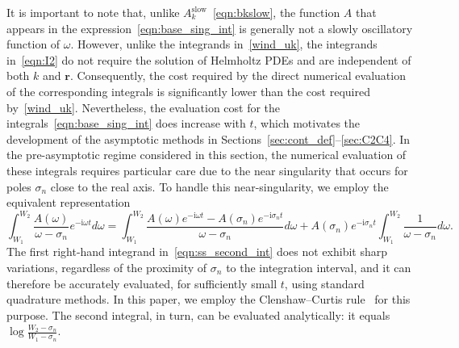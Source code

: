 \documentclass[11pt]{article}
\theoremstyle{plain}
\theoremstyle{remark}
\def \br{\mathbf{r}}
\begin{document}
It is important to note that, unlike
$A_k^{\mathrm{slow}}$~\eqref{eqn:bkslow}, the function $A$ that
appears in the expression~\eqref{eqn:base_sing_int} is generally not a
slowly oscillatory function of $\omega$. However, unlike the
integrands in~\eqref{wind_uk}, the integrands in~\eqref{eqn:I2} do not
require the solution of Helmholtz PDEs and are independent of both $k$
and $\br$. Consequently, the cost required by the direct numerical
evaluation of the corresponding integrals is significantly lower than
the cost required by~\eqref{wind_uk}. Nevertheless, the evaluation
cost for the integrals~\eqref{eqn:base_sing_int} does increase with
$t$, which motivates the development of the asymptotic methods in
Sections~\ref{sec:cont_def}--\ref{sec:C2C4}. In the pre-asymptotic
regime considered in this section, the numerical evaluation of these
integrals requires particular care due to the near singularity that
occurs for poles $\sigma_n$ close to the real axis. To handle this
near-singularity, we employ the equivalent representation
\begin{equation}\label{eqn:ss_second_int}
\int_{W_1}^{W_2} \frac{A(\omega)}{\omega - \sigma_n} e^{-\mathrm{i}\omega t} d\omega
= \int_{W_1}^{W_2} \frac{A(\omega)e^{-\mathrm{i}\omega t} - A(\sigma_n)e^{-\mathrm{i}\sigma_n t}}{\omega - \sigma_n} d\omega
+ A(\sigma_n)e^{-\mathrm{i}\sigma_n t} \int_{W_1}^{W_2} \frac{1}{\omega - \sigma_n} d\omega.
\end{equation}
The first right-hand integrand in~\eqref{eqn:ss_second_int} does not
exhibit sharp variations, regardless of the proximity of $\sigma_n$ to
the integration interval, and it can therefore be accurately
evaluated, for sufficiently small $t$, using standard quadrature
methods. In this paper, we employ the Clenshaw–Curtis
rule~\cite{waldvogel2006fast} for this purpose. The second integral,
in turn, can be evaluated analytically: it equals
$\log\frac{W_2-\sigma_n}{W_1-\sigma_n}.$
\end{document}
